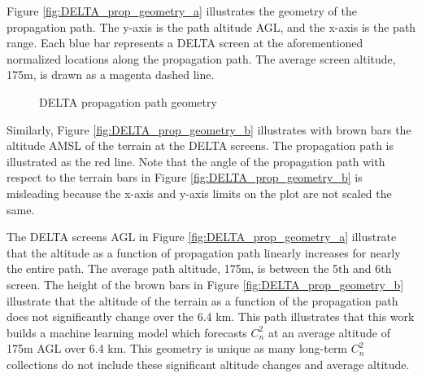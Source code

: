 Figure \ref{fig:DELTA_prop_geometry_a} illustrates the geometry of the propagation path. The y-axis is the path altitude AGL, and the x-axis is the path range. Each blue bar represents a DELTA screen at the aforementioned normalized locations along the propagation path. The average screen altitude, 175m, is drawn as a magenta dashed line.
\begin{figure}[h!]
	\centering
	\hfill
	\caption{DELTA propagation path geometry}
	\label{fig:DELTA_prop_geometry}
\end{figure}
Similarly, Figure \ref{fig:DELTA_prop_geometry_b} illustrates with brown bars the altitude AMSL of the terrain at the DELTA screens. The propagation path is illustrated as the red line. Note that the angle of the propagation path with respect to the terrain bars in Figure \ref{fig:DELTA_prop_geometry_b} is misleading because the x-axis and y-axis limits on the plot are not scaled the same.

The DELTA screens AGL in Figure \ref{fig:DELTA_prop_geometry_a} illustrate that the altitude as a function of propagation path linearly increases for nearly the entire path. The average path altitude, 175m, is between the 5th and 6th screen. The height of the brown bars in Figure \ref{fig:DELTA_prop_geometry_b} illustrate that the altitude of the terrain as a function of the propagation path does not significantly change over the 6.4 km. This path illustrates that this work builds a machine learning model which forecasts $C_{n}^{2}$ at an average altitude of 175m AGL over 6.4 km. This geometry is unique as many long-term $C_{n}^{2}$ collections do not include these significant altitude changes and average altitude.

